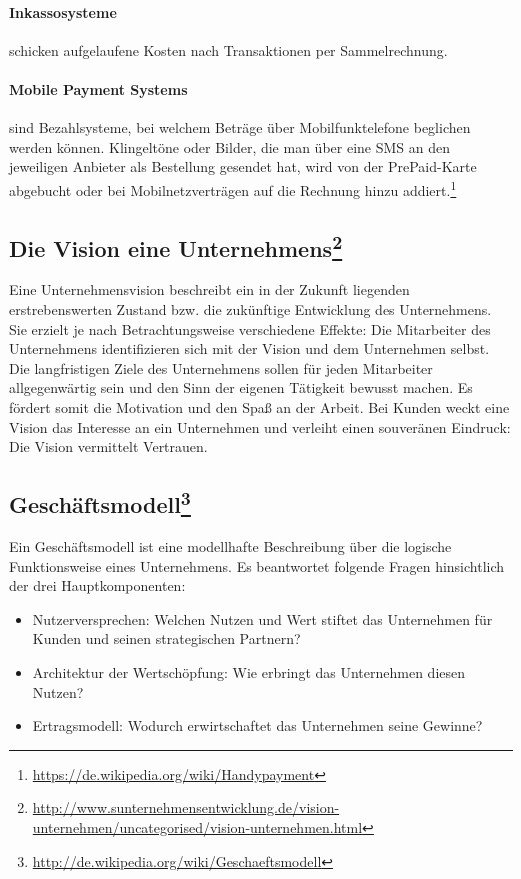 \paragraph{Inkassosysteme} schicken aufgelaufene Kosten nach Transaktionen per Sa\-mmelrechnung. 

\paragraph{Mobile Payment Systems} sind Bezahlsysteme, bei welchem Beträge über Mobilfunktelefone beglichen werden können. Klingeltöne oder Bilder, die man über eine SMS an den jeweiligen Anbieter als Bestellung gesendet hat, wird von der PrePaid-Karte abgebucht oder bei Mobilnetzverträgen auf die Rechnung hinzu addiert.\footnote{\url{ https://de.wikipedia.org/wiki/Handypayment}}



\subsection[Die Vision eines Unternehmens]{Die Vision eine Unternehmens\footnote{\url{ http://www.sunternehmensentwicklung.de/vision-unternehmen/uncategorised/vision-unternehmen.html}}}

Eine Unternehmensvision beschreibt ein in der Zukunft liegenden erstrebens\-werten Zustand bzw. die zukünftige Entwicklung des Unternehmens. Sie erzielt je nach Betrachtungsweise verschiedene Effekte: Die Mitarbeiter des Unternehmens identifizieren sich mit der Vision und dem Unternehmen selbst. Die langfristigen Ziele des Unternehmens sollen für jeden Mitarbeiter allgegenwärtig sein und den Sinn der eigenen Tätigkeit bewusst machen. Es fördert somit die Motivation und den Spaß an der Arbeit. Bei Kunden weckt eine Vision das Interesse an ein Unternehmen und verleiht einen souveränen Eindruck: Die Vision vermittelt Vertrauen.
 

\subsection[Geschäftsmodell]{Geschäftsmodell\footnote{\url{ http://de.wikipedia.org/wiki/Geschaeftsmodell}}}

Ein Geschäftsmodell ist eine modellhafte Beschreibung über die logische Funktionsweise eines Unternehmens. Es beantwortet folgende Fragen hinsichtlich der drei Hauptkomponenten:
\begin{itemize}
	\item Nutzerversprechen: Welchen Nutzen und Wert stiftet das Unternehmen für Kunden und seinen strategischen Partnern?
	\item Architektur der Wertschöpfung: Wie erbringt das Unternehmen diesen Nutzen?
	\item Ertragsmodell: Wodurch erwirtschaftet das Unternehmen seine Gewinne?
\end{itemize}

